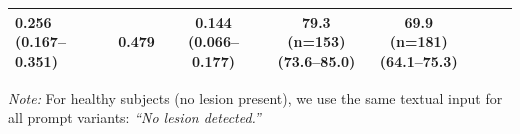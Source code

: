 \documentclass[FCD_GNN.tex]{subfiles}
\begin{document}
\begin{table}[H]
\begin{tabular}{lccccccc}
\makecell{\colorbox{green!15}{0.256} \\ (0.167--0.351)} &
0.479 &
\makecell{\colorbox{cyan!15}{0.144} \\ (0.066--0.177)} &
\makecell{79.3 (n=153) \\ (73.6--85.0)} &
\makecell{\colorbox{cyan!15}{69.9 (n=181)} \\ (64.1--75.3)} \\
\hline
\end{tabular}
\vspace{2mm}
\par\noindent\centering
\parbox{0.95\linewidth}{\footnotesize\textit{Note:} For healthy subjects (no lesion present), we use the same textual input for all prompt variants: \textit{``No lesion detected.''}}
\end{table}
\end{document}
